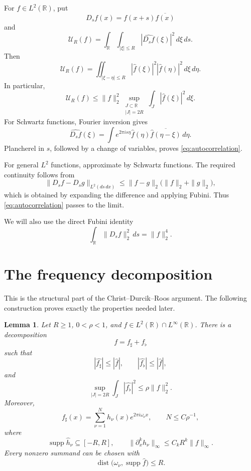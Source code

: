 \documentclass[11pt,a4paper]{article}
\newcommand{\R}{\mathbb R}
\DeclareMathOperator{\supp}{supp}
\DeclareMathOperator{\dist}{dist}
\newtheorem{lemma}{Lemma}[section]
\begin{document}
For $f\in L^2(\R)$, put
\[
D_sf(x)=f(x+s)\overline{f(x)}
\]
and
\[
\mathcal U_R(f)
=\int_{\R}\int_{|\xi|\leq R}
|\widehat{D_sf}(\xi)|^2\,d\xi\,ds.
\]
Then
\[
\mathcal U_R(f)
=\iint_{|\xi-\eta|\leq R}
|\widehat f(\xi)|^2|\widehat f(\eta)|^2\,d\xi\,d\eta.
\tag{1.6}\label{eq:autocorrelation}
\]
In particular,
\[
\mathcal U_R(f)
\leq\|f\|_2^2
\sup_{\substack{J\subset\R\\ |J|=2R}}
\int_J|\widehat f(\xi)|^2\,d\xi.
\tag{1.7}\label{eq:autocorrelation-bound}
\]
For Schwartz functions, Fourier inversion gives
\[
\widehat{D_sf}(\xi)
=\int e^{2\pi i s\eta}
\widehat f(\eta)\overline{\widehat f(\eta-\xi)}\,d\eta.
\]
Plancherel in $s$, followed by a change of variables, proves
\eqref{eq:autocorrelation}.

For general $L^2$ functions, approximate by Schwartz functions. The required
continuity follows from
\[
\|D_sf-D_sg\|_{L^2(ds\,dx)}
\leq\|f-g\|_2\bigl(\|f\|_2+\|g\|_2\bigr),
\]
which is obtained by expanding the difference and applying Fubini.
Thus \eqref{eq:autocorrelation} passes to the limit.

We will also use the direct Fubini identity
\[
\int_{\R}\|D_sf\|_2^2\,ds=\|f\|_2^4.
\tag{1.8}\label{eq:autocorrelation-total}
\]

\section{The frequency decomposition}

This is the structural part of the Christ--Durcik--Roos argument. The
following construction proves exactly the properties needed later.

\begin{lemma}\label{lem:decomposition}
Let $R\geq1$, $0<\rho<1$, and
$f\in L^2(\R)\cap L^\infty(\R)$. There is a decomposition
\[
f=f_\sharp+f_\flat
\]
such that
\[
|\widehat{f_\sharp}|\leq|\widehat f|,
\qquad |\widehat{f_\flat}|\leq|\widehat f|,
\tag{2.1}\label{eq:decomp-domination}
\]
and
\[
\sup_{|J|=2R}\int_J|\widehat{f_\flat}|^2
\leq\rho\|f\|_2^2.
\tag{2.2}\label{eq:decomp-flat}
\]
Moreover,
\[
f_\sharp(x)=\sum_{\nu=1}^Nh_\nu(x)e^{2\pi i\omega_\nu x},
\qquad N\leq C\rho^{-1},
\tag{2.3}\label{eq:decomp-sharp}
\]
where
\[
\supp\widehat h_\nu\subseteq[-R,R],\qquad
\|\partial_x^kh_\nu\|_\infty\leq C_kR^k\|f\|_\infty.
\tag{2.4}\label{eq:decomp-amplitudes}
\]
Every nonzero summand can be chosen with
\[
\dist\bigl(\omega_\nu,\supp\widehat f\bigr)\leq R.
\tag{2.5}\label{eq:decomp-centers}
\]
\end{lemma}
\end{document}
